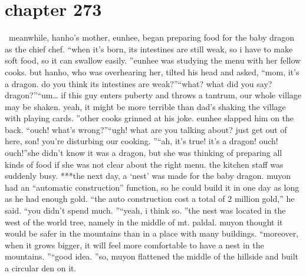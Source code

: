 \section{chapter 273}






 meanwhile, hanho’s mother, eunhee, began preparing food for the baby dragon as the chief chef.
“when it’s born, its intestines are still weak, so i have to make soft food, so it can swallow easily.
”eunhee was studying the menu with her fellow cooks.
but hanho, who was overhearing her, tilted his head and asked, “mom, it’s a dragon.
 do you think its intestines are weak?”“what? what did you say? dragon?”“um… if this guy enters puberty and throws a tantrum, our whole village may be shaken.
 yeah, it might be more terrible than dad’s shaking the village with playing cards.
”other cooks grinned at his joke.
eunhee slapped him on the back.
“ouch! what’s wrong?”“ugh! what are you talking about? just get out of here, son! you’re disturbing our cooking.
”“ah, it’s true! it’s a dragon! ouch! ouch!”she didn’t know it was a dragon, but she was thinking of preparing all kinds of food if she was not clear about the right menu.
the kitchen staff was suddenly busy.
***the next day, a ‘nest’ was made for the baby dragon.
 muyon had an “automatic construction” function, so he could build it in one day as long as he had enough gold.
“the auto construction cost a total of 2 million gold,” he said.
“you didn’t spend much.
”“yeah, i think so.
”the nest was located in the west of the world tree, namely in the middle of mt.
 paldal.
muyon thought it would be safer in the mountains than in a place with many buildings.
“moreover, when it grows bigger, it will feel more comfortable to have a nest in the mountains.
”“good idea.
”so, muyon flattened the middle of the hillside and built a circular den on it.

